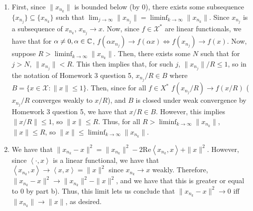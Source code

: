 \documentclass[11pt]{article}
\begin{document}
\begin{enumerate}[leftmargin=*, label=\arabic*.]
\begin{enumerate}
            Then, we can apply Banach-Alaoglu, which is theorem 4.48 in the notes, that says (applied to this context) that $\mathcal{X}^{*}$ separable implies that any bounded sequence in $(\mathcal{X}^{*})^{*}$ has a weak* convergent subsequence.
            In particular, this means that a sequence $\hat x_n$ in $\mathcal{X}^{**}$ has a subsequence $\hat x_{n_k}$ converging to some $\hat x \in \mathcal{X}^{**}$ with respect to weak* convergence.
            However, this means precisely for all $f \in X^{*}$, $\hat x_{n_k}(f) \to \hat x(f)$, which means that $f(x_n) \to f(x)$.
            This, then, is the same statement as $x_{n_k} \to x$ with respect to weak convergence in $\mathcal{X}$.
            Therefore, $x_{n_k}$ is a subsequence of $x_n$ that converges to $x \in \mathcal{X}$ weakly, as desired.
    \item First, since $\|x_{n_k}\|$ is bounded below (by 0), there exists some subsequence $\{x_{n_j}\} \subseteq \{x_{n_k}\} $ such that $\lim_{j \to \infty}\|x_{n_j}\| = \liminf_{k \to \infty} \|x_{n_k}\|$.
        Since $x_{n_j}$ is a subsequence of $x_{n_k}$, $x_{n_j} \to x$.
        Now, since $f \in \mathcal{X}^{*}$ are linear functionals, we have that for $\alpha \neq 0, \alpha \in \mathbb{C}$, $f(\alpha x_{n_j}) \to f(\alpha x) \iff f(x_{n_j}) \to f(x)$.
        Now, suppose $R > \liminf_{k \to \infty} \|x_{n_k}\|$.
        Then, there exists some $N$ such that for $j > N$, $\|x_{n_j}\| < R$.
        This then implies that, for such $j$, $\|x_{n_j}\| / R \leq 1$, so in the notation of Homework 3 question 5, $x_{n_j} / R \in B$ where $B = \{x \in \mathcal{X} : \|x\| \leq 1\} $.
        Then, since for all $f \in X^{*}$ $f(x_{n_j} / R) \to f(x / R)$ ($x_{n_j} / R$ converges weakly to $x / R$), and $B$ is closed under weak convergence by Homework 3 question 5, we have that $x / R \in B$.
        However, this implies $\|x / R\| \leq 1$, so $\|x\| \leq R$.
        Thus, for all $R > \liminf_{k \to \infty} \|x_{n_k}\|$, $\|x\| \leq R$, so $\|x\| \leq \liminf_{k \to \infty} \|x_{n_k}\|$.
    \item We have that $\|x_{n_k} - x\|^2 = \|x_{n_k}\|^2 -2 \text{Re} \left<x_{n_k}, x\right> + \|x\|^2$.
        However, since $\left<\cdot, x \right>$ is a linear functional, we have that $\left<x_{n_k}, x\right> \to \left<x, x\right> = \|x\|^2$ since $x_{n_k} \to x$ weakly.
        Therefore, $\|x_{n_k} -x\|^2 \to \|x_{n_k}\|^2 - \|x\|^2$, and we have that this is greater or equal to $0$ by part b).
        Thus, this limit lets us conclude that $\|x_{n_k} - x\|^2 \to 0$ iff $\|x_{n_k}\| \to \|x\|$, as desired.
    \end{enumerate}



\end{enumerate}
\end{document}
